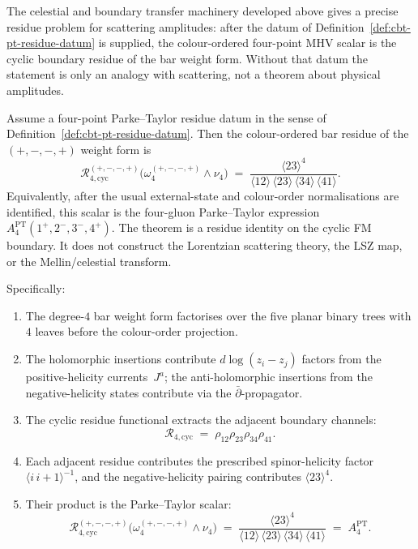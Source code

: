 The celestial and boundary transfer machinery developed above gives a
precise residue problem for scattering amplitudes: after the datum of
Definition~\ref{def:cbt-pt-residue-datum} is supplied, the
colour-ordered four-point MHV scalar is the cyclic boundary residue of
the bar weight form.  Without that datum the statement is only an
analogy with scattering, not a theorem about physical amplitudes.

\begin{theorem}
\label{thm:cbt-mhv-bar-integral}
Assume a four-point Parke--Taylor residue datum in the sense of
Definition~\ref{def:cbt-pt-residue-datum}.  Then the colour-ordered
bar residue of the \((+,-,-,+)\) weight form is
\[
\mathcal R^{(+,-,-,+)}_{4,\mathrm{cyc}}
\bigl(\omega_4^{(+,-,-,+)}\wedge\nu_4\bigr)
\;=\;
\frac{\langle 23\rangle^4}
 {\langle 12\rangle\,\langle 23\rangle\,
 \langle 34\rangle\,\langle 41\rangle}.
\]
Equivalently, after the usual external-state and colour-order
normalisations are identified, this scalar is the four-gluon
Parke--Taylor expression \(A_4^{\mathrm{PT}}(1^+,2^-,3^-,4^+)\).
The theorem is a residue identity on the cyclic FM boundary.  It does
not construct the Lorentzian scattering theory, the LSZ map, or the
Mellin/celestial transform.

Specifically:
\begin{enumerate}[label=\textup{(\alph*)}]
\item The degree-$4$ bar weight form factorises over the five planar
binary trees with \(4\) leaves before the colour-order projection.
\item The holomorphic insertions contribute $d\log(z_i - z_j)$ factors from the positive-helicity currents~$J^a$; the anti-holomorphic insertions from the negative-helicity states contribute via the $\bar\partial$-propagator.
\item The cyclic residue functional extracts the adjacent boundary
channels:
\[
\mathcal R_{4,\mathrm{cyc}}
\;=\;
\rho_{12}\rho_{23}\rho_{34}\rho_{41}.
\]
\item Each adjacent residue contributes the prescribed
spinor-helicity factor \(\langle i\,i{+}1\rangle^{-1}\), and the
negative-helicity pairing contributes \(\langle23\rangle^4\).
\item Their product is the Parke--Taylor scalar:
\[
\mathcal R^{(+,-,-,+)}_{4,\mathrm{cyc}}
\bigl(\omega_4^{(+,-,-,+)}\wedge\nu_4\bigr)
\;=\;
\frac{\langle 23\rangle^4}
 {\langle 12\rangle\,\langle 23\rangle\,
 \langle 34\rangle\,\langle 41\rangle}
\;=\; A_4^{\mathrm{PT}}.
\]
\end{enumerate}
\end{theorem}

